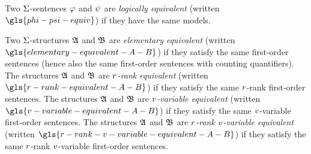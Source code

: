 
Two $\mathrm{\Sigma}$-sentences $\varphi$ and $\psi$ are \emph{logically equivalent}
(written $\gls{phi-psi-equiv}$) if they have the same models.

Two $\mathrm{\Sigma}$-structures $\mathfrak{A}$ and
$\mathfrak{B}$ are \emph{elementary equivalent} (written
$\gls{elementary-equivalent-A-B}$) if they satisfy the same first-order
sentences (hence also the same first-order sentences with counting quantifiers).
The structures $\mathfrak{A}$ and $\mathfrak{B}$ are \emph{$r$-rank equivalent} (written
$\gls{r-rank-equivalent-A-B}$) if they satisfy the same $r$-rank first-order
sentences.
The structures $\mathfrak{A}$ and $\mathfrak{B}$ are \emph{$v$-variable equivalent} (written
$\gls{v-variable-equivalent-A-B}$) if they satisfy the same $v$-variable
first-order sentences.
The structures $\mathfrak{A}$ and $\mathfrak{B}$ are \emph{$r$-rank $v$-variable
equivalent} (written $\gls{r-rank-v-variable-equivalent-A-B}$) if they satisfy
the same $r$-rank $v$-variable first-order sentences.